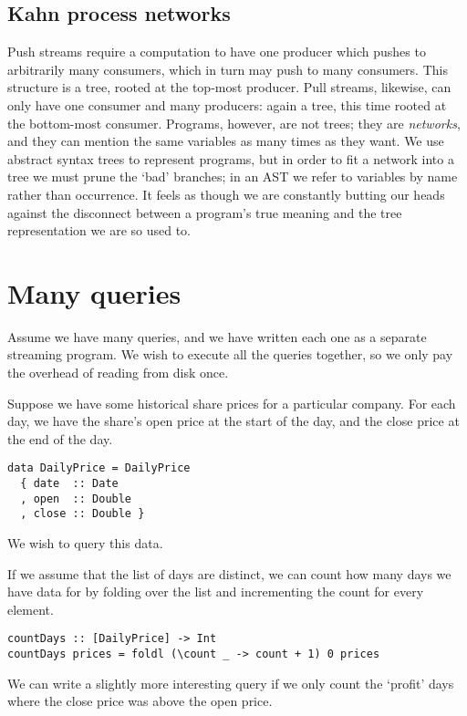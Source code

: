 \subsection{Kahn process networks}

Push streams require a computation to have one producer which pushes to arbitrarily many consumers, which in turn may push to many consumers.
This structure is a tree, rooted at the top-most producer.
Pull streams, likewise, can only have one consumer and many producers: again a tree, this time rooted at the bottom-most consumer.
Programs, however, are not trees; they are \emph{networks}, and they can mention the same variables as many times as they want.
We use abstract syntax trees to represent programs, but in order to fit a network into a tree we must prune the `bad' branches; in an AST we refer to variables by name rather than occurrence.
It feels as though we are constantly butting our heads against the disconnect between a program's true meaning and the tree representation we are so used to.


\section{Many queries}

Assume we have many queries, and we have written each one as a separate streaming program.
We wish to execute all the queries together, so we only pay the overhead of reading from disk once.

Suppose we have some historical share prices for a particular company.
For each day, we have the share's open price at the start of the day, and the close price at the end of the day.

\begin{lstlisting}
data DailyPrice = DailyPrice
  { date  :: Date
  , open  :: Double
  , close :: Double }
\end{lstlisting}

We wish to query this data.

If we assume that the list of days are distinct, we can count how many days we have data for by folding over the list and incrementing the count for every element.

\begin{lstlisting}
countDays :: [DailyPrice] -> Int
countDays prices = foldl (\count _ -> count + 1) 0 prices
\end{lstlisting}

We can write a slightly more interesting query if we only count the `profit' days where the close price was above the open price.

